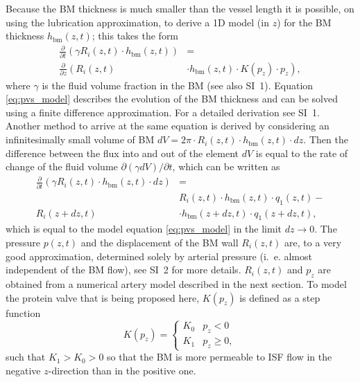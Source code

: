 \documentclass{frontiersFPHY} %
\newcommand{\ie}{i.~e.\xspace}
\newcommand{\dd}{\partial}
\begin{document}
Because the BM thickness is much smaller than the vessel length it is possible, on using the lubrication approximation, to derive a 1D model (in $z$) for the BM thickness $h_\textrm{bm}(z,t)$; this takes the form
\begin{equation}
\begin{split}
\frac{\dd}{\dd t} \left( \gamma R_i(z,t) \cdot h_\textrm{bm}(z,t) \right) &=\\
\frac{\dd}{\dd z} \left( R_i(z,t) \right. & \left. \cdot h_\textrm{bm}(z,t) \cdot K(p_{z}) \cdot p_{z} \right),\label{eq:pvs_model}
\end{split}
\end{equation}
where $\gamma$ is the fluid volume fraction in the BM (see also SI~1). Equation \eqref{eq:pvs_model} describes the evolution of the BM thickness and can be solved using a finite difference approximation. For a detailed derivation see SI~1. Another method to arrive at the same equation is derived by considering an infinitesimally small volume of BM $dV = 2\pi \cdot R_i(z,t) \cdot h_\textrm{bm}(z,t) \cdot dz$. Then the difference between the flux into and out of the element $dV$ is equal to the rate of change of the fluid volume $\dd (\gamma dV)/ \dd t$, which can be written as
\begin{equation}
\begin{split}
\frac{\dd}{\dd t} \left( \gamma R_i(z,t) \cdot h_\textrm{bm}(z,t) \cdot dz \right) &=\\
& R_i(z,t) \cdot h_\textrm{bm}(z,t) \cdot q_1(z,t) -\\
R_i(z + dz,t) & \cdot h_\textrm{bm}(z + dz,t) \cdot q_1(z + dz,t),
\end{split}
\end{equation}
which is equal to the model equation \eqref{eq:pvs_model} in the limit $dz \rightarrow 0$. The pressure $p(z,t)$ and the displacement of the BM wall $R_i(z,t)$ are, to a very good approximation, determined solely by arterial pressure (\ie almost independent of the BM flow), see SI~2 for more details. $R_i(z,t)$ and $p_z$ are obtained from a numerical artery model described in the next section. To model the protein valve that is being proposed here, $K(p_z)$ is defined as a step function
\begin{equation}
  K(p_z) = \begin{cases}
    K_0 & p_z < 0\\
    K_1 & p_z \geq 0,
  \end{cases}
\end{equation}
such that $K_1 > K_0 > 0$ so that the BM is more permeable to ISF flow in the negative $z$-direction than in the positive one.
\end{document}
